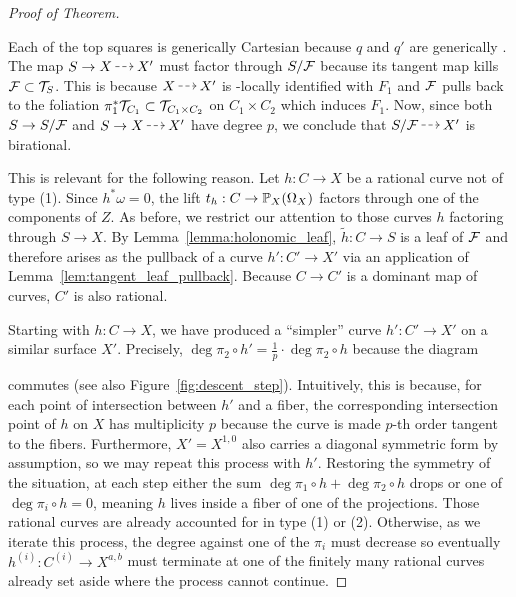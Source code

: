 \documentclass[main.tex]{subfiles}
\begin{document}
\begin{proof}[Proof of Theorem]
\begin{center}
\end{center}
Each of the top squares is generically Cartesian because $q$ and $q'$ are generically \etale. 
The map $S \to X \rat X'$ must factor through $S / \F$ because its tangent map kills $\F \subset \T_{S}$. This is because $X \rat X'$ is \etale-locally identified with $F_1$ and $\F$ pulls back to the foliation $\pi_1^* \T_{C_1} \subset \T_{C_1 \times C_2}$ on $C_1 \times C_2$ which induces $F_1$. Now, since both $S \to S / \F$ and $S \to X \rat X'$ have degree $p$, we conclude that $S / \F \rat X'$ is birational. 
\par 
This is relevant for the following reason. Let $h : C \to X$ be a rational curve not of type (1). Since $h^* \omega = 0$, the lift $t_h : C \to \P_X(\Omega_X)$ factors through one of the components of $Z$. As before, we restrict our attention to those curves $h$ factoring through $S \to X$. By Lemma~\ref{lemma:holonomic_leaf}, $\tilde{h} : C \to S$ is a leaf of $\F$ and therefore arises as the pullback of a curve $h' : C' \to X'$ via an application of Lemma~\ref{lem:tangent_leaf_pullback}. Because $C \to C'$ is a dominant map of curves, $C'$ is also rational.
\par 
Starting with $h : C \to X$, we have produced a ``simpler'' curve $h' : C' \to X'$ on a similar surface $X'$. Precisely, $\deg{\pi_2 \circ h'} = \frac{1}{p} \cdot \deg{\pi_2 \circ h}$ because the diagram
\begin{center}
\end{center}
commutes (see also Figure~\ref{fig:descent_step}). Intuitively, this is because, for each point of intersection between $h'$ and a fiber, the corresponding intersection point of $h$ on $X$ has multiplicity $p$ because the curve is made $p$-th order tangent to the fibers. Furthermore, $X' = X^{1,0}$ also carries a diagonal symmetric form by assumption, so we may repeat this process with $h'$. Restoring the symmetry of the situation, at each step either the sum $\deg{\pi_1 \circ h} + \deg{\pi_2 \circ h}$ drops or one of $\deg{\pi_i \circ h} = 0$, meaning $h$ lives inside a fiber of one of the projections. Those rational curves are already accounted for in type (1) or (2). Otherwise, as we iterate this process, the degree against one of the $\pi_i$ must decrease so eventually $h^{(i)} : C^{(i)} \to X^{a,b}$ must terminate at one of the finitely many rational curves already set aside where the process cannot continue. 

\end{proof}
\end{document}
